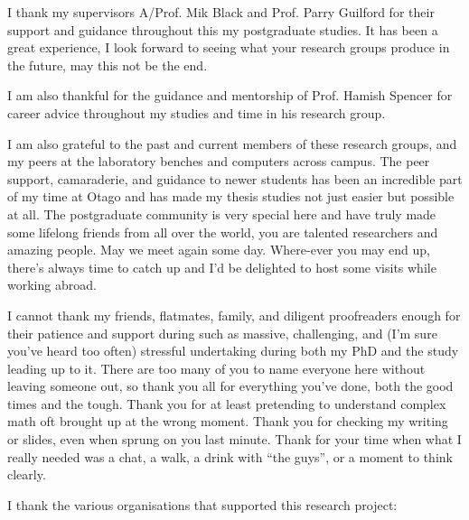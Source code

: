 I thank my supervisors A/Prof. Mik Black and Prof. Parry Guilford for their support and guidance throughout this my postgraduate studies. It has been a great experience, I look forward to seeing what your research groups produce in the future, may this not be the end.

I am also thankful for the guidance and mentorship of Prof. Hamish Spencer for career advice throughout my studies and time in his research group.

I am also grateful to the past and current members of these research groups, and my peers at the laboratory benches and computers across campus. The peer support, camaraderie, and guidance to newer students has been an incredible part of my time at Otago and has made my thesis studies not just easier but possible at all. The postgraduate community is very special here and have truly made some lifelong friends from all over the world, you are talented researchers and amazing people. May we meet again some day. Where-ever you may end up, there's always time to catch up and I'd be delighted to host some visits while working abroad.

I cannot thank my friends, flatmates, family, and diligent proofreaders enough for their patience and support during such as massive, challenging, and (I'm sure you've heard too often) stressful undertaking during both my PhD and the study leading up to it. There are too many of you to name everyone here without leaving someone out, so thank you all for everything you've done, both the good times and the tough. Thank you for at least pretending to understand complex math oft brought up at the wrong moment. Thank you for checking my writing or slides, even when sprung on you last minute. Thank for your time when what I really needed was a chat, a walk, a drink with ``the guys'', or a moment to think clearly.

I thank the various organisations that supported this research project:

